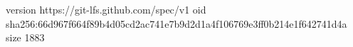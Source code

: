 version https://git-lfs.github.com/spec/v1
oid sha256:66d967f664f89b4d05cd2ac741e7b9d2d1a4f106769e3ff0b214e1f642741d4a
size 1883
